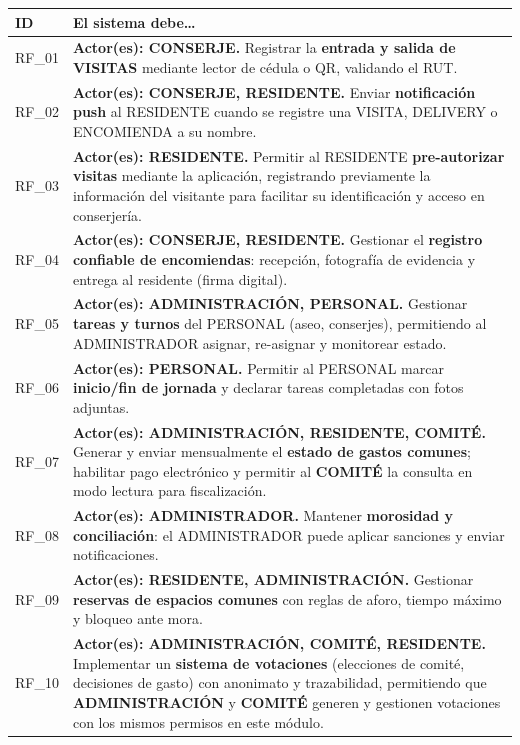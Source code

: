 {\small\setlength{\tabcolsep}{4pt}\renewcommand{\arraystretch}{1.2}
\begin{longtable}{|p{}|p{}|}
\hline
\textbf{ID} & \textbf{El sistema debe…} \\ \hline
RF\_01 & \textbf{Actor(es): CONSERJE.} Registrar la \textbf{entrada y salida de VISITAS} mediante lector de cédula o QR, validando el RUT. \\ \hline
RF\_02 & \textbf{Actor(es): CONSERJE, RESIDENTE.} Enviar \textbf{notificación push} al RESIDENTE cuando se registre una VISITA, DELIVERY o ENCOMIENDA a su nombre. \\ \hline
RF\_03 & \textbf{Actor(es): RESIDENTE.} Permitir al RESIDENTE \textbf{pre-autorizar visitas} mediante la aplicación, registrando previamente la información del visitante para facilitar su identificación y acceso en conserjería. \\ \hline
RF\_04 & \textbf{Actor(es): CONSERJE, RESIDENTE.} Gestionar el \textbf{registro confiable de encomiendas}: recepción, fotografía de evidencia y entrega al residente (firma digital). \\ \hline
RF\_05 & \textbf{Actor(es): ADMINISTRACIÓN, PERSONAL.} Gestionar \textbf{tareas y turnos} del PERSONAL (aseo, conserjes), permitiendo al ADMINISTRADOR asignar, re-asignar y monitorear estado. \\ \hline
RF\_06 & \textbf{Actor(es): PERSONAL.} Permitir al PERSONAL marcar \textbf{inicio/fin de jornada} y declarar tareas completadas con fotos adjuntas. \\ \hline
RF\_07 & \textbf{Actor(es): ADMINISTRACIÓN, RESIDENTE, COMITÉ.} Generar y enviar mensualmente el \textbf{estado de gastos comunes}; habilitar pago electrónico y permitir al \textbf{COMITÉ} la consulta en modo lectura para fiscalización. \\ \hline
RF\_08 & \textbf{Actor(es): ADMINISTRADOR.} Mantener \textbf{morosidad y conciliación}: el ADMINISTRADOR puede aplicar sanciones y enviar notificaciones. \\ \hline
RF\_09 & \textbf{Actor(es): RESIDENTE, ADMINISTRACIÓN.} Gestionar \textbf{reservas de espacios comunes} con reglas de aforo, tiempo máximo y bloqueo ante mora. \\ \hline
RF\_10 & \textbf{Actor(es): ADMINISTRACIÓN, COMITÉ, RESIDENTE.} Implementar un \textbf{sistema de votaciones} (elecciones de comité, decisiones de gasto) con anonimato y trazabilidad, permitiendo que \textbf{ADMINISTRACIÓN} y \textbf{COMITÉ} generen y gestionen votaciones con los mismos permisos en este módulo. \\ \hline

\end{longtable}}
